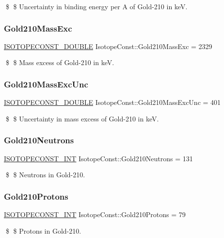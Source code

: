 \$ \$ Uncertainty in binding energy per A of Gold-\/210 in keV. \mbox{\label{group___isotope_const-_gold-_au210_ga3a31f0ed5c1017b3e721daeeac10169e}} 
\subsubsection{\texorpdfstring{Gold210\+Mass\+Exc}{Gold210MassExc}}
{\footnotesize\ttfamily \mbox{\hyperlink{group___isotope_const-_macros_ga8f45a7272ce02c0b4c65c44636ed719a}{I\+S\+O\+T\+O\+P\+E\+C\+O\+N\+S\+T\+\_\+\+D\+O\+U\+B\+LE}} Isotope\+Const\+::\+Gold210\+Mass\+Exc = 2329}

\$ \$ Mass excess of Gold-\/210 in keV. \mbox{\label{group___isotope_const-_gold-_au210_gac9187b4553c90d2734d99a10adc6265b}} 
\subsubsection{\texorpdfstring{Gold210\+Mass\+Exc\+Unc}{Gold210MassExcUnc}}
{\footnotesize\ttfamily \mbox{\hyperlink{group___isotope_const-_macros_ga8f45a7272ce02c0b4c65c44636ed719a}{I\+S\+O\+T\+O\+P\+E\+C\+O\+N\+S\+T\+\_\+\+D\+O\+U\+B\+LE}} Isotope\+Const\+::\+Gold210\+Mass\+Exc\+Unc = 401}

\$ \$ Uncertainty in mass excess of Gold-\/210 in keV. \mbox{\label{group___isotope_const-_gold-_au210_gaf42c9a1f8fb2f87ce47d4ceca6205308}} 
\subsubsection{\texorpdfstring{Gold210\+Neutrons}{Gold210Neutrons}}
{\footnotesize\ttfamily \mbox{\hyperlink{group___isotope_const-_macros_ga5f18360b3e99483a35c32d789e62621c}{I\+S\+O\+T\+O\+P\+E\+C\+O\+N\+S\+T\+\_\+\+I\+NT}} Isotope\+Const\+::\+Gold210\+Neutrons = 131}

\$ \$ Neutrons in Gold-\/210. \mbox{\label{group___isotope_const-_gold-_au210_ga0d2eaf7b0851b06227d1289438f77abd}} 
\subsubsection{\texorpdfstring{Gold210\+Protons}{Gold210Protons}}
{\footnotesize\ttfamily \mbox{\hyperlink{group___isotope_const-_macros_ga5f18360b3e99483a35c32d789e62621c}{I\+S\+O\+T\+O\+P\+E\+C\+O\+N\+S\+T\+\_\+\+I\+NT}} Isotope\+Const\+::\+Gold210\+Protons = 79}

\$ \$ Protons in Gold-\/210. 